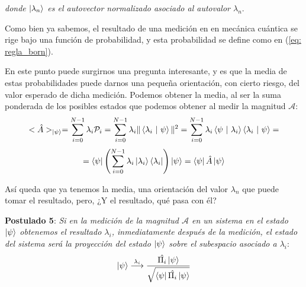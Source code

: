 \documentclass[12pt]{article}
\numberwithin{equation}{section} %
\begin{document}
    \textit{donde \( \ket{\lambda_{n}} \) es el autovector normalizado asociado al autovalor \( \lambda_{n} \)}.
    
    \vspace{5mm}

    Como bien ya sabemos, el resultado de una medición en en mecánica cuántica se rige bajo una función de probabilidad, y esta probabilidad se define como en (\ref{eq: regla_born}).

    \vspace{5mm}

    En este punto puede surgirnos una pregunta interesante, y es que la media de estas probabilidades puede darnos una pequeña orientación, con cierto riesgo, del valor esperado de dicha medición. Podemos obtener la media, al ser la suma ponderada de los posibles estados que podemos obtener al medir la magnitud \( \mathcal{A} \):
    \begin{equation*}
        < \hat{A} >_{\ket{\psi}} = \sum_{i = 0}^{N - 1} \lambda_{i} \mathcal{P}_{i} = \sum_{i = 0}^{N - 1} \lambda_{i} \| \braket{\lambda_{i} \ | \ \psi} \| ^ {2} = \sum_{i = 0}^{N - 1} \lambda_{i} \braket{\psi \ | \ \lambda_{i}} \braket{\lambda_{i} \ | \ \psi} =
    \end{equation*}
    \begin{equation*}
        = \bra{\psi} \left( \sum_{i = 0}^{N - 1} \lambda_{i} \ket{\lambda_{i}} \bra{\lambda_{i}} \right) \ket{\psi} = \bra{\psi} \hat{A} \ket{\psi}
    \end{equation*}

    \vspace{1.5mm}

    Así queda que ya tenemos la media, una orientación del valor \( \lambda_{n} \) que puede tomar el resultado, pero, ¿Y el resultado, qué pasa con él?

    \vspace{10mm}

    \textbf{Postulado 5}: \textit{Si en la medición de la magnitud \( \mathcal{A} \) en un sistema en el estado \( \ket{\psi} \) obtenemos el resultado \( \lambda_{i} \), inmediatamente después de la medición, el estado del sistema será la proyección del estado \( \ket{\psi} \) sobre el subespacio asociado a \( \lambda_{i} \)}:
    \begin{equation}
        \ket{\psi} \overset{\lambda_{i}}{\longrightarrow} \frac{\hat{\Pi_{i}} \ket{\psi}}{\sqrt{\bra{\psi} \hat{\Pi_{i}} \ket{\psi}}}
    \end{equation}
\end{document}
